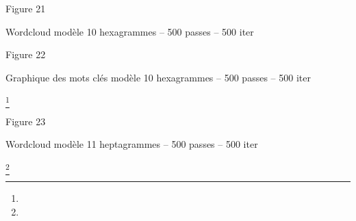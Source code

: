 \documentclass[letterpaper,portrait,12pt]{article}
\begin{document}
Figure 21





Wordcloud mod\`{e}le 10 hexagrammes -- 500 passes -- 500 iter

















Figure 22





Graphique des mots cl\'{e}s mod\`{e}le 10 hexagrammes -- 500 passes -- 500 iter


\footnote{} 


















































Figure 23





Wordcloud mod\`{e}le 11 heptagrammes -- 500 passes -- 500 iter





\footnote{} 
\end{document}
